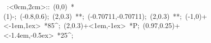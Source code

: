%


\hbox{
\xy    <2cm,0cm>:<0cm,2cm>::
       (0,0) *\ellipse(1){-}; 
       (-0.8,0.6); (2,0.3) **\dir{-};
       (-0.70711,-0.70711); (2,0.3) **\dir{-}; 
       (-1,0)+<-1em,1ex> *{85^\circ};
       (2,0.3)+<1em,-1ex> *{P};
       (0.97,0.25)+<-1.4em,-0.5ex> *{25^\circ};
\endxy}

